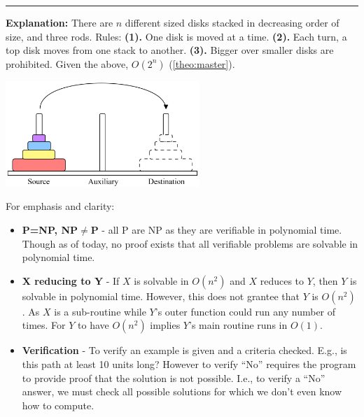\begin{Func}

    \label{TowersOfHanoi}
    \vspace{-.5em}
    \begin{algorithm}[H]
        \SetAlgoLined
    \end{algorithm}
    \noindent
    \rule{\textwidth}{0.4pt}
    \textbf{Explanation:} There are $n$ different sized disks stacked in decreasing order of size, and three rods. Rules:
    \textbf{(1).} One disk is moved at a time. \textbf{(2).} Each turn, a top disk moves from one stack to another. \textbf{(3).} Bigger over smaller disks are prohibited.
    Given the above, $O(2^n)$ (\ref{theo:master}).
    \begin{center}
        \includegraphics[width=0.55\textwidth]{Sections/hard/hanoi.png}
    \end{center}
    
\end{Func}

\newpage 

\noindent
For emphasis and clarity:
\begin{theo}

    \begin{itemize}
        \item \textbf{P=NP, NP$\neq$P} - all P are NP as they are verifiable in polynomial time. Though as of today, no proof exists that all verifiable problems are solvable in polynomial time.
        \item \textbf{X reducing to Y} - If $X$ is solvable in $O(n^2)$ and $X$ reduces to $Y$, then $Y$ is solvable in polynomial time. However, 
        this does not grantee that $Y$ is $O(n^2)$. As $X$ is a sub-routine while $Y$'s outer function could run any number of times. For $Y$ to have $O(n^2)$ implies 
        $Y$'s main routine runs in $O(1)$.
        \item \textbf{Verification} - To verify an example is given and a criteria checked. E.g., is this path at least 10 units long?
        However to verify ``No'' requires the program to provide proof that the solution is not possible. I.e., to verify a ``No'' answer, we must check all possible solutions for which 
        we don't even know how to compute.
    \end{itemize}
\end{theo}

